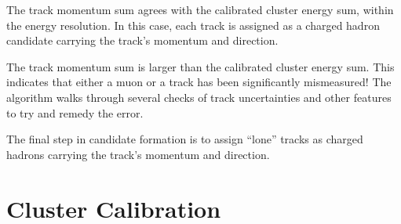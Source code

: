 The track momentum sum agrees with the calibrated cluster energy sum, within the energy resolution.  In this case, each track is assigned as a charged hadron candidate carrying the track’s momentum and direction.  

The track momentum sum is larger than the calibrated cluster energy sum. This indicates that either a muon or a track has been significantly mismeasured! The algorithm walks through several checks of track uncertainties and other features to try and remedy the error. 

The final step in candidate formation is to assign “lone” tracks as charged hadrons carrying the track’s momentum and direction. 

\section{Cluster Calibration}


